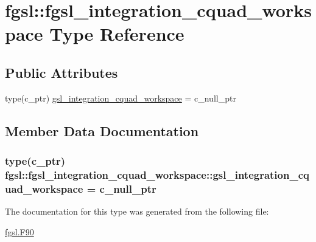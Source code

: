\hypertarget{structfgsl_1_1fgsl__integration__cquad__workspace}{\section{fgsl\-:\-:fgsl\-\_\-integration\-\_\-cquad\-\_\-workspace Type Reference}
\label{structfgsl_1_1fgsl__integration__cquad__workspace}
}
\subsection*{Public Attributes}
\begin{DoxyCompactItemize}
\item 
type(c\-\_\-ptr) \hyperlink{structfgsl_1_1fgsl__integration__cquad__workspace_ad8d5b9a3dff8f436c2b5dc4d7db6c8bd}{gsl\-\_\-integration\-\_\-cquad\-\_\-workspace} = c\-\_\-null\-\_\-ptr
\end{DoxyCompactItemize}


\subsection{Member Data Documentation}
\hypertarget{structfgsl_1_1fgsl__integration__cquad__workspace_ad8d5b9a3dff8f436c2b5dc4d7db6c8bd}{
\subsubsection[{gsl\-\_\-integration\-\_\-cquad\-\_\-workspace}]{\setlength{\rightskip}{0pt plus 5cm}type(c\-\_\-ptr) fgsl\-::fgsl\-\_\-integration\-\_\-cquad\-\_\-workspace\-::gsl\-\_\-integration\-\_\-cquad\-\_\-workspace = c\-\_\-null\-\_\-ptr}}\label{structfgsl_1_1fgsl__integration__cquad__workspace_ad8d5b9a3dff8f436c2b5dc4d7db6c8bd}


The documentation for this type was generated from the following file\-:\begin{DoxyCompactItemize}
\item 
\hyperlink{fgsl_8F90}{fgsl.\-F90}\end{DoxyCompactItemize}
